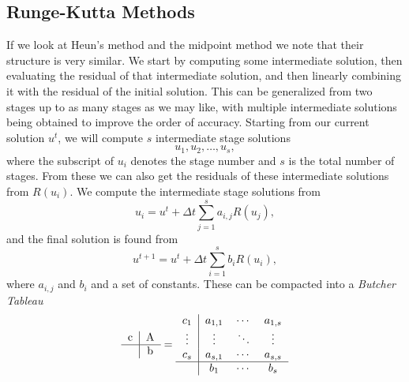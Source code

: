 \subsection{Runge-Kutta Methods}
If we look at Heun's method and the midpoint method we note that their structure is very similar. We start by computing some intermediate solution, then evaluating the residual of that intermediate solution, and then linearly combining it with the residual of the initial solution. This can be generalized from two stages up to as many stages as we may like, with multiple intermediate solutions being obtained to improve the order of accuracy. Starting from our current solution $u^t$, we will compute $s$ intermediate stage solutions
\begin{equation}
	u_1, u_2, \hdots, u_s,
\end{equation}
where the subscript of $u_i$ denotes the stage number and $s$ is the total number of stages. From these we can also get the residuals of these intermediate solutions from $R(u_i)$. We compute the intermediate stage solutions from
\begin{equation}
	u_i = u^t + \Delta t \sum_{j=1}^s a_{i,j} R(u_j),
\end{equation}
and the final solution is found from
\begin{equation}
	u^{t+1} = u^t + \Delta t \sum_{i=1}^s b_i R(u_i),
\end{equation}
where $a_{i,j}$ and $b_i$ and a set of constants. These can be compacted into a {\it Butcher Tableau}
\begin{equation}
	\begin{tabular}{c|ccccc}
 
	c   & A \\
 
	\hline
 
	         & b\\
 
	\end{tabular}
    = 	
	\begin{tabular}{c|ccccc}
 
	$c_1$    & $a_{1,1}$ & $\cdots$ & $a_{1,s}$ \\
 
	$\vdots$ & $\vdots$ &  $\ddots$ & $\vdots$\\
 
	$c_s$    & $a_{s,1}$  & $\cdots$ & $a_{s,s}$\\
 
	\hline
 
	         & $b_1$  & $\cdots$ & $b_s$\\
 
	\end{tabular}
\end{equation}
